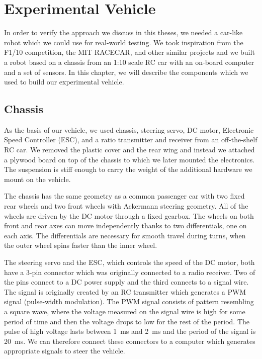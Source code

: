 \chapter{Experimental Vehicle}

In order to verify the approach we discuss in this theses, we needed a car-like robot which we could use for real-world testing. We took inspiration from the F1/10 competition, the MIT RACECAR, and other similar projects and we built a robot based on a chassis from an 1:10 scale RC car with an on-board computer and a set of sensors. In this chapter, we will describe the components which we used to build our experimental vehicle.

\section{Chassis}

As the basis of our vehicle, we used chassis, steering servo, DC motor, Electronic Speed Controller (ESC), and a ratio transmitter and receiver from an off-the-shelf RC car. We removed the plastic cover and the rear wing and instead we attached a plywood board on top of the chassis to which we later mounted the electronics. The suspension is stiff enough to carry the weight of the additional hardware we mount on the vehicle.

The chassis has the same geometry as a common passenger car with two fixed rear wheels and two front wheels with Ackermann steering geometry. All of the wheels are driven by the DC motor through a fixed gearbox. The wheels on both front and rear axes can move independently thanks to two differentials, one on each axis. The differentials are necessary for smooth travel during turns, when the outer wheel spins faster than the inner wheel.

The steering servo and the ESC, which controls the speed of the DC motor, both have a 3-pin connector which was originally connected to a radio receiver. Two of the pins connect to a DC power supply and the third connects to a signal wire. The signal is originally created by an RC transmitter which generates a PWM signal (pulse-width modulation). The PWM signal consists of pattern resembling a square wave, where the voltage measured on the signal wire is high for some period of time and then the voltage drops to low for the rest of the period. The pulse of high voltage lasts between \SI{1}{\milli\second} and \SI{2}{\milli\second} and the period of the signal is \SI{20}{\milli\second}. We can therefore connect these connectors to a computer which generates appropriate signals to steer the vehicle.

